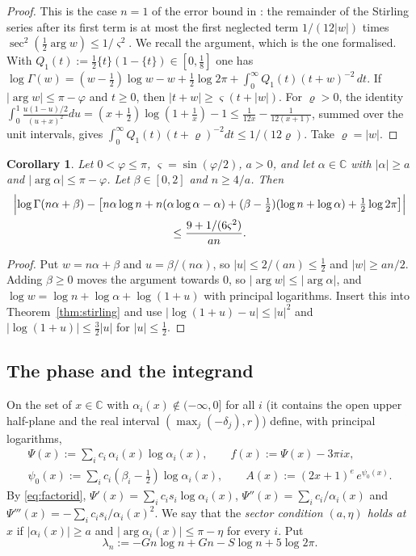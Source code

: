 \documentclass[11pt]{amsart}
\newtheorem{corollary}[theorem]{Corollary}
\theoremstyle{definition}
\theoremstyle{remark}
\numberwithin{equation}{section}
\newcommand{\CC}{\mathbb{C}}
\begin{document}
\begin{proof}
This is the case $n=1$ of the error bound in \cite[\S5.11(ii)]{DLMF}: the remainder of the Stirling series
\cite[(5.11.1)]{DLMF} after its first term is at most the first neglected term $1/(12|w|)$ times
$\sec^2(\frac12\arg w)\le1/\varsigma^2$. We recall the argument, which is the one formalised. With
$Q_1(t):=\frac12\{t\}(1-\{t\})\in[0,\frac18]$ one has
$\log\Gamma(w)=(w-\frac12)\log w-w+\frac12\log2\pi+\int_0^\infty Q_1(t)(t+w)^{-2}\,dt$. If $|\arg w|\le\pi-\varphi$
and $t\ge0$, then $|t+w|\ge\varsigma(t+|w|)$. For $\varrho>0$, the identity
$\int_0^1\frac{u(1-u)/2}{(u+x)^2}du=(x+\frac12)\log(1+\frac1x)-1\le\frac1{12x}-\frac1{12(x+1)}$, summed over the unit
intervals, gives $\int_0^\infty Q_1(t)(t+\varrho)^{-2}dt\le1/(12\varrho)$. Take $\varrho=|w|$.
\end{proof}

\begin{corollary}\label{cor:stirling}
Let $0<\varphi\le\pi$, $\varsigma=\sin(\varphi/2)$, $a>0$, and let $\alpha\in\CC$ with $|\alpha|\ge a$ and
$|\arg\alpha|\le\pi-\varphi$. Let $\beta\in[0,2]$ and $n\ge4/a$. Then
\begin{multline*}
  \Bigl|\log\Gamma(n\alpha+\beta)-\bigl[n\alpha\log n+n(\alpha\log\alpha-\alpha)
   +(\beta-\tfrac12)(\log n+\log\alpha)+\tfrac12\log2\pi\bigr]\Bigr|\\
   \le\frac{9+1/(6\varsigma^2)}{an}.
\end{multline*}
\end{corollary}

\begin{proof}
Put $w=n\alpha+\beta$ and $u=\beta/(n\alpha)$, so $|u|\le2/(an)\le\frac12$ and $|w|\ge an/2$. Adding $\beta\ge0$ moves
the argument towards $0$, so $|\arg w|\le|\arg\alpha|$, and $\log w=\log n+\log\alpha+\log(1+u)$ with principal
logarithms. Insert this into Theorem~\ref{thm:stirling} and use $|\log(1+u)-u|\le|u|^2$ and
$|\log(1+u)|\le\frac32|u|$ for $|u|\le\frac12$.
\end{proof}

\subsection{The phase and the integrand}

On the set of $x\in\CC$ with $\alpha_i(x)\notin(-\infty,0]$ for all $i$ (it contains the open upper half-plane
and the real interval $(\max_j(-\delta_j),r)$) define, with principal logarithms,
\begin{gather*}
  \Psi(x):=\sum_ic_i\,\alpha_i(x)\log\alpha_i(x),\qquad f(x):=\Psi(x)-3\pi ix,\\
  \psi_0(x):=\sum_ic_i(\beta_i-\tfrac12)\log\alpha_i(x),\qquad A(x):=(2x+1)^e\,e^{\psi_0(x)} .
\end{gather*}
By \eqref{eq:factorid}, $\Psi'(x)=\sum_ic_is_i\log\alpha_i(x)$, $\Psi''(x)=\sum_ic_i/\alpha_i(x)$ and
$\Psi'''(x)=-\sum_ic_is_i/\alpha_i(x)^2$. We say that the \emph{sector condition $(a,\eta)$ holds at $x$} if
$|\alpha_i(x)|\ge a$ and $|\arg\alpha_i(x)|\le\pi-\eta$ for every $i$. Put
\[
  \lambda_n:=-Gn\log n+Gn-S\log n+5\log2\pi .
\]
\end{document}
